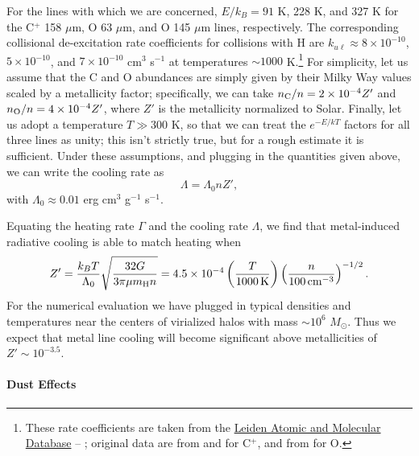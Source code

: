 For the lines with which we are concerned, $E/k_B = 91$ K, 228 K, and 327 K for the C$^+$ 158 $\mu$m, O 63 $\mu$m, and O 145 $\mu$m lines, respectively. The corresponding collisional de-excitation rate coefficients for collisions with H are $k_{u\ell}\approx 8\times 10^{-10}$, $5\times 10^{-10}$, and $7\times 10^{-10}$ cm$^3$ s$^{-1}$ at temperatures $\sim 1000$ K.\footnote{These rate coefficients are taken from the \href{http://home.strw.leidenuniv.nl/~moldata/}{Leiden Atomic and Molecular Database} -- \citet{schoier05a}; original data are from \citet{launay77a} and \citet{barinovs05a} for C$^+$, and from \citet{abrahamsson07a} for O.} For simplicity, let us assume that the C and O abundances are simply given by their Milky Way values scaled by a metallicity factor; specifically, we can take $n_{\rm C}/n = 2\times 10^{-4} Z'$ and $n_{\rm O}/n = 4\times 10^{-4} Z'$, where $Z'$ is the metallicity normalized to Solar. Finally, let us adopt a temperature $T \gg 300$ K, so that we can treat the $e^{-E/kT}$ factors for all three lines as unity; this isn't strictly true, but for a rough estimate it is sufficient. Under these assumptions, and plugging in the quantities given above, we can write the cooling rate as
\begin{equation}
\Lambda = \Lambda_0 n Z',
\end{equation}
with $\Lambda_0 \approx 0.01$ erg cm$^3$ g$^{-1}$ s$^{-1}$.

Equating the heating rate $\Gamma$ and the cooling rate $\Lambda$, we find that metal-induced radiative cooling is able to match heating when
\begin{equation}
Z' = \frac{k_B T}{\Lambda_0} \sqrt{\frac{32 G}{3\pi \mu m_{\rm H} n}} = 4.5\times 10^{-4} \left(\frac{T}{1000\,\mathrm{K}}\right)\left(\frac{n}{100\,\mathrm{cm}^{-3}}\right)^{-1/2}.
\end{equation}
For the numerical evaluation we have plugged in typical densities and temperatures near the centers of virialized halos with mass $\sim 10^6$ $M_\odot$. Thus we expect that metal line cooling will become significant above metallicities of $Z'\sim 10^{-3.5}$.


\paragraph{Dust Effects}

